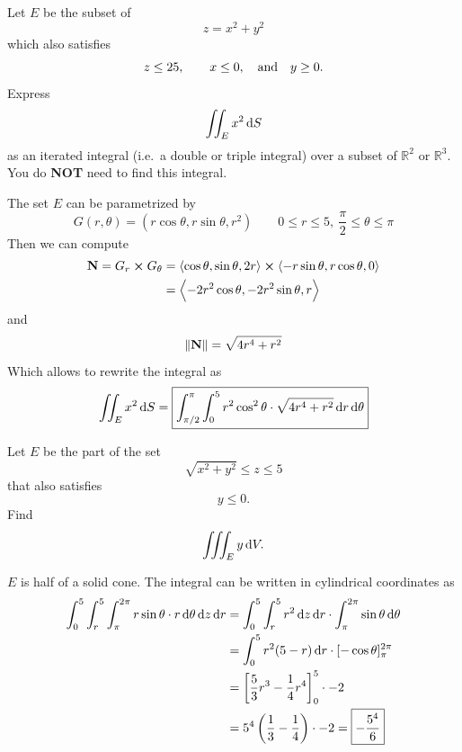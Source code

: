 \documentclass[12pt,answers]{exam}
\newcommand{\vect}[1]{\left\langle #1 \right\rangle}
\newcommand{\RR}{\mathbb{R}}
\begin{document}
\begin{questions}
	\newpage
	\question
	Let $E$ be the subset of
	\[
		z = x^2 + y^2
	\]
	which also satisfies 
	\[
		z \le 25, \qquad x \le 0, \qand y \ge 0.
	\]
	Express
	\[
		\iint_E x^2 \dif S
	\]
	as an iterated integral (i.e.~a double or triple integral) over a subset of $\RR^2$ or $\RR^3$. You do \textbf{NOT} need to find this integral.
	\begin{solution}
		The set $E$ can be parametrized by 
		\[
			G(r, \theta) = (r \cos \theta, r\sin\theta, r^2) \qquad 0 \le r \le 5, \ \frac\pi2\le \theta\le \pi
		\]
		Then we can compute
		\begin{align*}
			\vb{N} = G_r \cross G_\theta 
			&= \vect{\cos \theta, \sin\theta, 2r} \cross \vect{-r\sin\theta, r\cos\theta, 0}  \\ 
			&= \vect{-2r^2\cos\theta, -2r^2\sin\theta, r}
		\end{align*}
		and
		\[
			\|\vb{N}\| = \sqrt{4r^4+r^2}
		\]
		Which allows to rewrite the integral as
		\[
			\iint_E x^2 \dif S = \boxed{\int_{\pi/2}^\pi \int_0^5 r^2 \cos^2\theta \cdot \sqrt{4r^4+r^2} \dif r \dif \theta}
		\]
		
	\end{solution}

	\newpage
	\question
	Let $E$ be the part of the set
	\[
		\sqrt{x^2+y^2} \le z \le 5
	\]
	that also satisfies
	\[
		y \le 0.
	\]
	Find 
	\[
		\iiint_{E} y \dif V.
	\]
	\begin{solution}
		$E$ is half of a solid cone.
		The integral can be written in cylindrical coordinates as
		\begin{align*}
			\int_0^5 \int_r^5 \int_\pi^{2\pi} r \sin\theta \cdot r \dif \theta \dif z \dif r
			&= \int_0^5 \int_r^5 r^2 \dif z \dif r \cdot \int_\pi^{2\pi} \sin\theta\dif \theta \\ 
			&= \int_0^5 r^2 (5-r) \dif r \cdot [-\cos \theta]_\pi^{2\pi} \\
		&= \left[\frac53 r^3 - \frac14 r^4 \right]_0^5 \cdot -2 \\
		&= 5^4 \left(\frac13 - \frac 14\right) \cdot -2 = \boxed{-\frac{5^4}{6}}
		\end{align*}
	\end{solution}

\end{questions}
\end{document}
